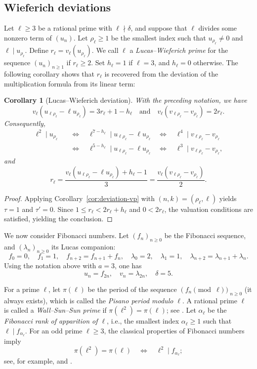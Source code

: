\documentclass[12pt]{amsart}
\numberwithin{equation}{section}
\newtheorem{corollary}[theorem]{Corollary}
\theoremstyle{remark}
\theoremstyle{plain}
\begin{document}
\subsection{Wieferich deviations}
Let $\ell\geq3$ be a rational prime with $\ell\nmid\delta$, and suppose that $\ell$ divides some nonzero term of $(u_n)$. Let $\rho_\ell\ge1$ be the smallest index such that $u_{\rho_\ell}\neq0$ and $\ell\mid u_{\rho_\ell}$. Define $r_\ell=v_\ell(u_{\rho_\ell})$. We call $\ell$ a \emph{Lucas--Wieferich prime} for the sequence $(u_n)_{n\geq1}$ if $r_\ell\geq2$. Set $h_\ell=1$ if $\ell=3$, and $h_\ell=0$ otherwise. The following corollary shows that $r_\ell$ is recovered from the deviation of the multiplication formula from its linear term:
\begin{corollary}[Lucas--Wieferich deviation]\label{cor:wieferich-deviation}
	With the preceding notation, we have
	\[
	v_\ell(u_{\ell\rho_\ell}-\ell u_{\rho_\ell})=3r_\ell+1-h_\ell\quad\text{and}\quad v_\ell(v_{\ell\rho_\ell}-v_{\rho_\ell})=2r_\ell.
	\]
	Consequently,
	\[
	\begin{aligned}
		\ell^2\mid u_{\rho_\ell}\quad&\Longleftrightarrow\quad\ell^{7-h_\ell}\mid u_{\ell\rho_\ell}-\ell u_{\rho_\ell}\quad\Longleftrightarrow\quad\ell^4\mid v_{\ell\rho_\ell}-v_{\rho_\ell}\\
		&\Longleftrightarrow\quad\ell^{5-h_\ell}\mid u_{\ell\rho_\ell}-\ell u_{\rho_\ell}\quad\Longleftrightarrow\quad\ell^3\mid v_{\ell\rho_\ell}-v_{\rho_\ell},
	\end{aligned}
	\]
	and
	\[
	r_\ell=
	\frac{v_\ell(u_{\ell\rho_\ell}-\ell u_{\rho_\ell})+h_\ell-1}{3}=\frac{v_\ell(v_{\ell\rho_\ell}-v_{\rho_\ell})}{2}.
	\]
\end{corollary}
\begin{proof}
	Applying Corollary~\ref{cor:deviation-vp} with $(n,k)=(\rho_\ell,\ell)$ yields $\tau=1$ and $\tau'=0$. Since $1\leq r_\ell<2r_\ell+h_\ell$ and $0<2r_\ell$, the valuation conditions are satisfied, yielding the conclusion.
\end{proof}

\medskip

We now consider Fibonacci numbers. Let $(f_n)_{n\geq0}$ be the Fibonacci sequence, and $(\lambda_n)_{n\geq0}$ its Lucas companion:
\[
f_0=0,\quad f_1=1,\quad f_{n+2}=f_{n+1}+f_n,\quad\lambda_0=2,\quad\lambda_1=1,\quad\lambda_{n+2}=\lambda_{n+1}+\lambda_n.
\]
Using the notation above with $a=3$, one has
\[
u_n=f_{2n},\quad v_n=\lambda_{2n},\quad\delta=5.
\]

For a prime $\ell$, let $\pi(\ell)$ be the period of the sequence $(f_n\pmod{\ell})_{n\ge0}$ (it always exists), which is called the \emph{Pisano period modulo $\ell$}. A rational prime $\ell$ is called a \emph{Wall--Sun--Sun prime} if $\pi(\ell^2)=\pi(\ell)$; see \cite{Wall60,SS92,HarringtonJones23}. Let $\alpha_\ell$ be the \emph{Fibonacci rank of apparition of $\ell$}, i.e., the smallest index $\alpha_\ell\geq1$ such that $\ell\mid f_{\alpha_\ell}$. For an odd prime $\ell\geq3$, the classical properties of Fibonacci numbers imply
\[
\pi(\ell^2)=\pi(\ell)\quad\Longleftrightarrow\quad \ell^2\mid f_{\alpha_\ell};
\]
see, for example, \cite{Wall60} and \cite[Theorem~2]{Vinson63}.
\end{document}
